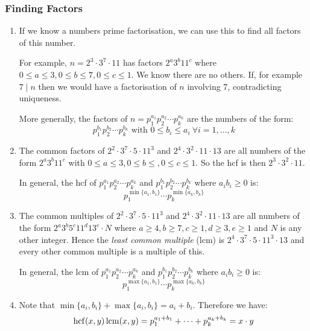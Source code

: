 \documentclass[../main.tex]{subfiles}
\begin{document}
\subsubsection{Finding Factors}
\begin{enumerate}
  \item If we know a numbers prime factorisation, we can use this to find all factors of this number.

    For example, $n = 2^{3} \cdot 3^{7} \cdot 11$ has factors $2^{a}3^{b}11^{c}$ where $0 \leq a \leq3, 0 \leq b \leq7, 0 \leq c \leq 1$.
    We know there are no others.
    If, for example $7 \mid n$ then we would have a factorisation of $n$ involving 7, contradicting uniqueness.

    More generally, the factors of $n = p^{a_1}_{1} p^{a_2}_{2} \cdots p^{a_k}_{k}$ are the numbers of the form:
    \[
      p^{b_1}_{1} p^{b_2}_{2} \cdots p^{b_k}_{k} \text{ with } 0\leq b_i \leq a_i\ \forall i = 1, \ldots, k
    \]
  \item The common factors of $2^{2} \cdot 3^{7} \cdot 5 \cdot 11^{3}$ and $2^{4} \cdot 3^{2} \cdot 11 \cdot 13$ are all numbers of the form $2^{a}3^{b}11^{c}$ with $0 \leq a \leq 3, 0\leq b \leq , 0\leq c\leq 1$.
    So the hcf is then $2^{3} \cdot 3^{2} \cdot 11$.

    In general, the hcf of $p^{a_1}_{1} p^{a_2}_{2} \cdots p^{a_k}_{k}$ and $p^{b_1}_{1} p^{b_2}_{2} \cdots p^{b_k}_{k}$ where $a_i b_i \geq 0$ is:
    \[
      p^{\min\{a_1, b_1\}}_{1} \cdots p^{\min\{a_k, b_k\}}_{k}
    \]
  \item The common multiples of $2^{2} \cdot 3^{7} \cdot 5 \cdot 11^{3}$ and $2^{4} \cdot 3^{2} \cdot 11 \cdot 13$ are all numbers of the form $2^{a}3^{b}5^{c}11^{d}13^{e} \cdot N$ where $a \geq 4, b \geq 7, c \geq 1, d\geq 3, e\geq 1$ and $N$ is any other integer.
    Hence the \textit{least common multiple} (lcm) is $2^{4} \cdot 3^{7} \cdot 5 \cdot 11^{3} \cdot 13$ and every other common multiple is a multiple of this.


    In general, the lcm of $p^{a_1}_{1} p^{a_2}_{2} \cdots p^{a_k}_{k}$ and $p^{b_1}_{1} p^{b_2}_{2} \cdots p^{b_k}_{k}$ where $a_i b_i \geq 0$ is:
    \[
      p^{\max\{a_1, b_1\}}_{1} \cdots p^{\max\{a_k, b_k\}}_{k}
    \]
  \item Note that $\min\{a_i, b_i\} + \max\{a_i, b_i\} = a_i + b_i$.
    Therefore we have:
    \[
      \operatorname{hcf}(x, y)\operatorname{lcm}(x, y) = p^{a_1 + b_1}_{1} + \cdots + p^{a_k + b_k}_{k} = x \cdot y
    \]
\end{enumerate}
\end{document}
